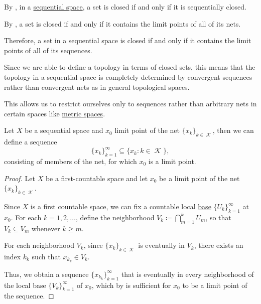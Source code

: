 \begin{remark}\label{rem:sequential_spaces}
  By , in a \hyperref[def:sequential_space]{sequential space}, a set is closed if and only if it is sequentially closed.

  By , a set is closed if and only if it contains the limit points of all of its nets.

  Therefore, a set in a sequential space is closed if and only if it contains the limit points of all of its sequences.

  Since we are able to define a topology in terms of closed sets, this means that the topology in a sequential space is completely determined by convergent sequences rather than convergent nets as in general topological spaces.

  This allows us to restrict ourselves only to sequences rather than arbitrary nets in certain spaces like \hyperref[def:metric_space]{metric spaces}.
\end{remark}

\begin{lemma}\label{thm:sequential_space_convergence}
  Let \( X \) be a sequential space and \( x_0 \) limit point of the net \( \{ x_k \}_{k \in \mscrK} \), then we can define a sequence
  \begin{equation*}
    \{ x_k \}_{k=1}^\infty \subseteq \{ x_k \colon k \in \mscrK \},
  \end{equation*}
  consisting of members of the net, for which \( x_0 \) is a limit point.
\end{lemma}
\begin{proof}
  Let \( X \) be a first-countable space and let \( x_0 \) be a limit point of the net \( \{ x_k \}_{k \in \mscrK} \).

  Since \( X \) is a first countable space, we can fix a countable local \hyperref[def:topological_local_base]{base} \( \{ U_k \}_{k=1}^\infty \) at \( x_0 \). For each \( k = 1, 2, \ldots \), define the neighborhood \( V_k \coloneqq \bigcap_{m=1}^k U_m \), so that \( V_k \subseteq V_m \) whenever \( k \geq m \).

  For each neighborhood \( V_k \), since \( \{ x_k \}_{k \in \mscrK} \) is eventually in \( V_k \), there exists an index \( k_k \) such that \( x_{k_k} \in V_k \).

  Thus, we obtain a sequence \( \{ x_{k_k} \}_{k=1}^\infty \) that is eventually in every neighborhood of the local base \( \{ V_k \}_{k=1}^\infty \) of \( x_0 \), which by  is sufficient for \( x_0 \) to be a limit point of the sequence.
\end{proof}

